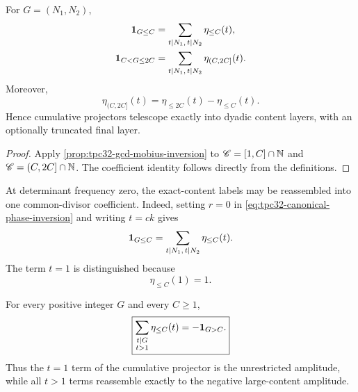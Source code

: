 \begin{corollary}
\label{cor:tpc32-dyadic-content-projector}
For \(G=(N_1,N_2)\),
\begin{align}
 \mathbf 1_{G\le C}
 &=\sum_{t\mid N_1,\,t\mid N_2}\eta_{\le C}(t),
 \label{eq:tpc32-cumulative-projector-identity}\\
 \mathbf 1_{C<G\le2C}
 &=\sum_{t\mid N_1,\,t\mid N_2}\eta_{(C,2C]}(t).
 \label{eq:tpc32-dyadic-projector-identity}
\end{align}
Moreover,
\begin{equation}
 \eta_{(C,2C]}(t)
 =\eta_{\le2C}(t)-\eta_{\le C}(t).
 \label{eq:tpc32-dyadic-projector-difference}
\end{equation}
Hence cumulative projectors telescope exactly into dyadic content
layers, with an optionally truncated final layer.
\end{corollary}

\begin{proof}
Apply \cref{prop:tpc32-gcd-mobius-inversion} to
\(\mathscr C=[1,C]\cap\mathbb N\) and
\(\mathscr C=(C,2C]\cap\mathbb N\).  The coefficient identity follows
directly from the definitions.
\end{proof}

At determinant frequency zero, the exact-content labels may be
reassembled into one common-divisor coefficient.  Indeed, setting
\(r=0\) in \eqref{eq:tpc32-canonical-phase-inversion} and writing
\(t=ck\) gives
\begin{equation}
 \mathbf 1_{G\le C}
 =\sum_{t\mid N_1,\,t\mid N_2}\eta_{\le C}(t).
\end{equation}
The term \(t=1\) is distinguished because
\begin{equation}
 \eta_{\le C}(1)=1.
 \label{eq:tpc32-t-one-coefficient}
\end{equation}

\begin{proposition}[\(t=1\) and large-content reassembly]
\label{prop:tpc32-t-one-large-reassembly}
For every positive integer \(G\) and every \(C\ge1\),
\begin{equation}
 \boxed{
 \sum_{\substack{t\mid G\\t>1}}\eta_{\le C}(t)
 =-\mathbf 1_{G>C}.}
 \label{eq:tpc32-nontrivial-projector-reassembly}
\end{equation}
Thus the \(t=1\) term of the cumulative projector is the unrestricted
amplitude, while all \(t>1\) terms reassemble exactly to the negative
large-content amplitude.
\end{proposition}


